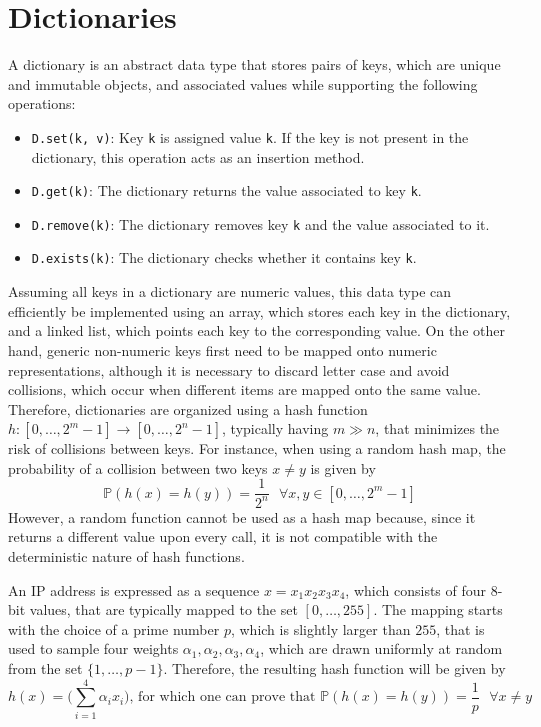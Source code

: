 \documentclass{report}
\begin{document}
\section{Dictionaries}
A dictionary is an abstract data type that stores pairs of keys, which are unique and immutable objects, and associated values while supporting the following operations:
\begin{itemize}
    \item \texttt{D.set(k, v)}: Key \texttt{k} is assigned value \texttt{k}. \newline
    If the key is not present in the dictionary, this operation acts as an insertion method.
    \item \texttt{D.get(k)}: The dictionary returns the value associated to key \texttt{k}.
    \item \texttt{D.remove(k)}: The dictionary removes key \texttt{k} and the value associated to it.
    \item \texttt{D.exists(k)}: The dictionary checks whether it contains key \texttt{k}.
\end{itemize}
Assuming all keys in a dictionary are numeric values, this data type can efficiently be implemented using an array, which stores each key in the dictionary, and a linked list, which points each key to the corresponding value. \newline
On the other hand, generic non-numeric keys first need to be mapped onto numeric representations, although it is necessary to discard letter case and avoid collisions, which occur when different items are mapped onto the same value. \newline
Therefore, dictionaries are organized using a hash function $\displaystyle h: [0, \dots, 2^m - 1] \to [0, \dots, 2^n - 1]$, typically having $\displaystyle m \gg n$, that minimizes the risk of collisions between keys. \newline
For instance, when using a random hash map, the probability of a collision between two keys $\displaystyle x \neq y$ is given by
\[\mathbb{P}(h(x) = h(y)) = \frac{1}{2^n} \text{ } \forall x, y \in [0, \dots, 2^m - 1]\]
However, a random function cannot be used as a hash map because, since it returns a different value upon every call, it is not compatible with the deterministic nature of hash functions.
\begin{examplebox}
    An IP address is expressed as a sequence $\displaystyle x = x_1x_2x_3x_4$, which consists of four $\displaystyle 8$-bit values, that are typically mapped to the set $\displaystyle [0, \dots, 255]$. \newline
    The mapping starts with the choice of a prime number $\displaystyle p$, which is slightly larger than $\displaystyle 255$, that is used to sample four weights $\displaystyle \alpha_1, \alpha_2, \alpha_3, \alpha_4$, which are drawn uniformly at random from the set $\displaystyle \{1, \dots, p - 1\}$. \newline
    Therefore, the resulting hash function will be given by
    \[h(x) = \Bigg(\sum_{i = 1}^4 \alpha_ix_i\Bigg) \text{, for which one can prove that } \mathbb{P}(h(x) = h(y)) = \frac{1}{p} \text{ } \forall x \neq y\]
\end{examplebox}
\end{document}
